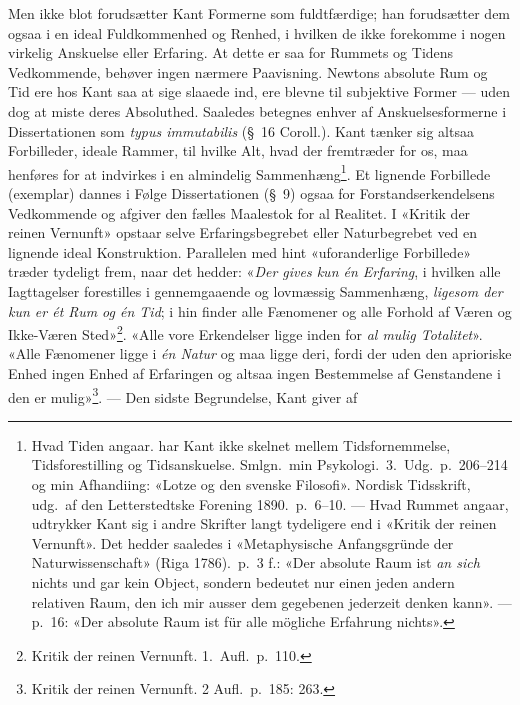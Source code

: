 \documentclass[12pt,a4paper]{article}
\begin{document}
Men ikke blot forudsætter Kant Formerne som fuldtfærdige; han forudsætter
dem ogsaa i en ideal Fuldkommenhed og Renhed, i hvilken de ikke forekomme
i nogen virkelig Anskuelse eller Erfaring. At dette er saa for Rummets og
Tidens Vedkommende, behøver ingen nærmere Paavisning. Newtons absolute
Rum og Tid ere hos Kant saa at sige slaaede ind, ere blevne til subjektive
Former --- uden dog at miste deres Absoluthed. Saaledes betegnes enhver
af Anskuelsesformerne i Dissertationen som \emph{typus immutabilis} (§\
16 Coroll.). Kant tænker sig altsaa Forbilleder, ideale Rammer, til
hvilke Alt, hvad der fremtræder for os, maa henføres for at indvirkes i
en almindelig Sammenhæng\footnote{Hvad Tiden angaar. har Kant ikke
skelnet mellem Tidsfornemmelse, Tidsforestilling og Tidsanskuelse.
Smlgn.\ min Psykologi.\ 3.\ Udg.\ p.\ 206--214 og min Afhandiing: «Lotze
og den svenske Filosofi». Nordisk Tidsskrift, udg.\ af den
Letterstedtske Forening 1890.\ p.\ 6--10. --- Hvad Rummet angaar,
udtrykker Kant sig i andre Skrifter langt tydeligere end i «Kritik der
reinen Vernunft». Det hedder saaledes i «Metaphysische Anfangsgründe der
Naturwissenschaft» (Riga 1786).\ p.\ 3 f.: «Der absolute Raum ist \emph{an sich}
nichts und gar kein Object, sondern bedeutet nur einen jeden andern
relativen Raum, den ich mir ausser dem gegebenen jederzeit denken kann».
--- p.\ 16: «Der absolute Raum ist für alle mögliche Erfahrung
nichts».}. Et lignende Forbillede (exemplar) dannes i Følge
Dissertationen (§\ 9) ogsaa for Forstandserkendelsens Vedkommende og
afgiver den fælles Maalestok for al Realitet. I «Kritik der reinen
Vernunft» opstaar selve Erfaringsbegrebet eller Naturbegrebet ved en
lignende ideal Konstruktion. Parallelen med hint «uforanderlige
Forbillede» træder tydeligt frem, naar det hedder: «\emph{Der gives kun én
Erfaring}, i hvilken alle Iagttagelser forestilles i gennemgaaende og
lovmæssig Sammenhæng, \emph{ligesom der kun er ét Rum og én Tid}; i hin finder
alle Fænomener og alle Forhold af Væren og Ikke-Væren
Sted»\footnote{Kritik der reinen Vernunft. 1.\ Aufl.\ p.\ 110.}.
«Alle vore Erkendelser ligge inden for \emph{al mulig Totalitet}». «Alle
Fænomener ligge i \emph{én Natur} og maa ligge deri, fordi der uden den
aprioriske Enhed ingen Enhed af Erfaringen og altsaa ingen Bestemmelse af
Genstandene i den er mulig»\footnote{Kritik der reinen Vernunft.
2 Aufl.\ p.\ 185: 263.}. --- Den sidste Begrundelse, Kant giver af
\end{document}
